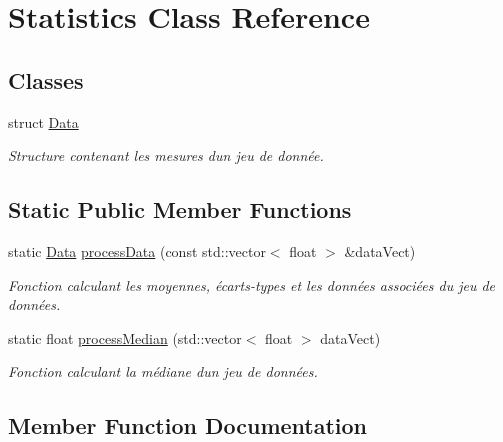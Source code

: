 \hypertarget{classStatistics}{}\section{Statistics Class Reference}
\label{classStatistics}
\subsection*{Classes}
\begin{DoxyCompactItemize}
\item 
struct \hyperlink{structStatistics_1_1Data}{Data}
\begin{DoxyCompactList}\small\item\em Structure contenant les mesures d\textquotesingle{}un jeu de donnée. \end{DoxyCompactList}\end{DoxyCompactItemize}
\subsection*{Static Public Member Functions}
\begin{DoxyCompactItemize}
\item 
static \hyperlink{structStatistics_1_1Data}{Data} \hyperlink{classStatistics_aaa2152a3f262ce8d003663f993420c4c}{process\+Data} (const std\+::vector$<$ float $>$ \&data\+Vect)
\begin{DoxyCompactList}\small\item\em Fonction calculant les moyennes, écarts-\/types et les données associées du jeu de données. \end{DoxyCompactList}\item 
static float \hyperlink{classStatistics_ae1c12077162711aa0ea8b4ee6e15b4da}{process\+Median} (std\+::vector$<$ float $>$ data\+Vect)
\begin{DoxyCompactList}\small\item\em Fonction calculant la médiane d\textquotesingle{}un jeu de données. \end{DoxyCompactList}\end{DoxyCompactItemize}


\subsection{Member Function Documentation}
\mbox{\label{classStatistics_aaa2152a3f262ce8d003663f993420c4c}} 

